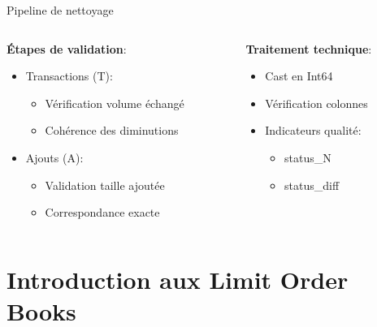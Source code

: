 \documentclass[aspectratio=169]{beamer}  %
\begin{document}
\begin{frame}{Pipeline de nettoyage}
    \begin{columns}
        \begin{column}{0.48\textwidth}
            \textbf{Étapes de validation}:
            \begin{itemize}
                \item Transactions (T):
                \begin{itemize}
                    \item Vérification volume échangé
                    \item Cohérence des diminutions
                \end{itemize}
                \item Ajouts (A):
                \begin{itemize}
                    \item Validation taille ajoutée
                    \item Correspondance exacte
                \end{itemize}
            \end{itemize}
        \end{column}
        \begin{column}{0.48\textwidth}
            \textbf{Traitement technique}:
            \begin{itemize}
                \item Cast en Int64
                \item Vérification colonnes
                \item Indicateurs qualité:
                \begin{itemize}
                    \item status\_N
                    \item status\_diff
                \end{itemize}
            \end{itemize}
        \end{column}
    \end{columns}
\end{frame}

\section{Introduction aux Limit Order Books}
\end{document}
